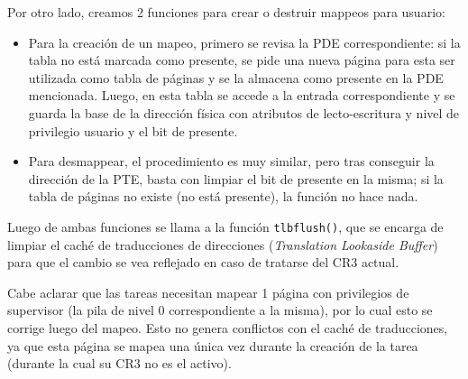 	Por otro lado, creamos 2 funciones para crear o destruir mappeos para usuario:
	\begin{itemize}

		\item Para la creación de un mapeo, primero se revisa la PDE correspondiente: si la tabla no está marcada como presente, se pide una nueva página para esta ser utilizada como tabla de páginas y se la almacena como presente en la PDE mencionada. Luego, en esta tabla se accede a la entrada correspondiente y se guarda la base de la dirección física con atributos de lecto-escritura y nivel de privilegio usuario y el bit de presente.

		\item Para desmappear, el procedimiento es muy similar, pero tras conseguir la dirección de la PTE, basta con limpiar el bit de presente en la misma; si la tabla de páginas no existe (no está presente), la función no hace nada.
	\end{itemize}

	Luego de ambas funciones se llama a la función \texttt{tlbflush()}, que se encarga de limpiar el caché de traducciones de direcciones (\textit{Translation Lookaside Buffer}) para que el cambio se vea reflejado en caso de tratarse del CR3 actual.

	Cabe aclarar que las tareas necesitan mapear 1 página con privilegios de supervisor (la pila de nivel 0 correspondiente a la misma), por lo cual esto se corrige luego del mapeo. Esto no genera conflictos con el caché de traducciones, ya que esta página se mapea una única vez durante la creación de la tarea (durante la cual su CR3 no es el activo).